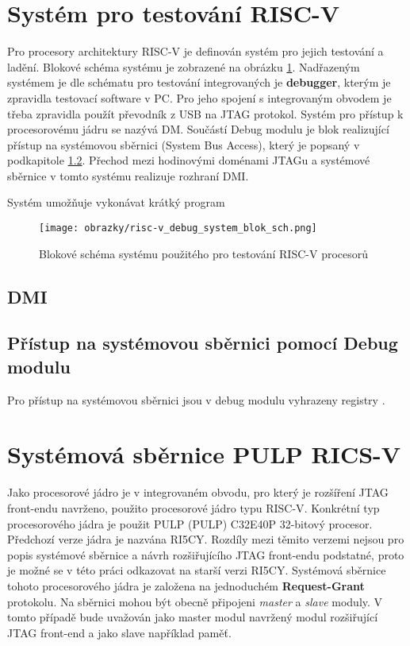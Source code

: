 \section{Systém pro testování \acs{RISC-V}}
Pro procesory architektury \acs{RISC-V} je definován systém pro jejich testování a ladění. Blokové schéma systému je zobrazené na obrázku \ref{fig:blok_sch_risc-v_dbg}. Nadřazeným systémem je dle schématu pro testování integrovaných je \textbf{debugger}, kterým je zpravidla testovací software v PC. Pro jeho spojení s integrovaným obvodem je třeba zpravidla použít převodník z USB na JTAG protokol. Systém pro přístup k procesorovému jádru se nazývá \ac{DM}. Součástí Debug modulu je blok realizující přístup na systémovou sběrnici (System Bus Access), který je popsaný v podkapitole \ref{subsec:dm_sba}. Přechod mezi hodinovými doménami \acs{JTAG}u a systémové sběrnice v tomto systému realizuje rozhraní \ac{DMI}. \cite{risc-v_dbg}


Systém umožňuje vykonávat krátký program 

\begin{figure}[!h]
  \begin{center}
    \texttt{[image: obrazky/risc-v\_debug\_system\_blok\_sch.png]}
  \end{center}
  \caption{Blokové schéma systému použitého pro testování \acs{RISC-V} procesorů \cite{risc-v_dbg}}
	\label{fig:blok_sch_risc-v_dbg}
\end{figure}

\subsection{\acs{DMI}}		\label{subsec:dmi}

\subsection{Přístup na systémovou sběrnici pomocí Debug modulu}		\label{subsec:dm_sba}
Pro přístup	na systémovou sběrnici jsou v debug modulu vyhrazeny registry 			. \cite{risc-v_dbg}

\section{Systémová sběrnice PULP RICS-V}
Jako procesorové jádro je v integrovaném obvodu, pro který je rozšíření JTAG front-endu navrženo, použito procesorové jádro typu \acs{RISC-V}. Konkrétní typ procesorového jádra je použit \acs{PULP} (\acl{PULP}) C32E40P 32-bitový procesor. Předchozí verze jádra je nazvána RI5CY. Rozdíly mezi těmito verzemi nejsou pro popis systémové sběrnice a návrh rozšiřujícího JTAG front-endu podstatné, proto je možné se v této práci odkazovat na starší verzi RI5CY. Systémová sběrnice tohoto procesorového jádra je založena na jednoduchém \textbf{Request-Grant} protokolu. Na sběrnici mohou být obecně připojeni \textit{master} a \textit{slave} moduly. V tomto případě bude uvažován jako master modul navržený modul rozšiřující JTAG front-end a jako slave například paměť.

